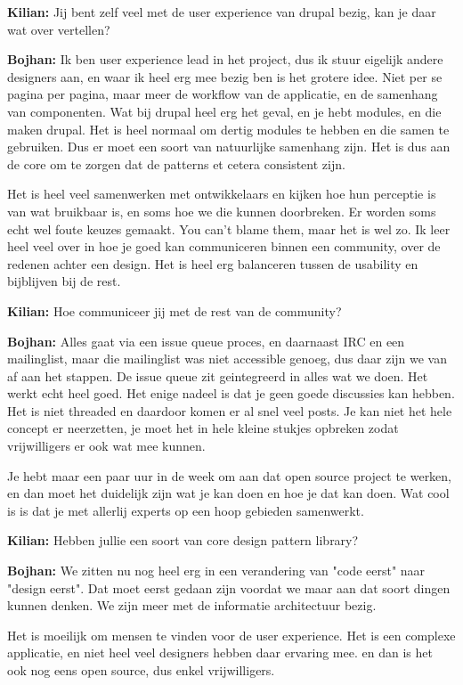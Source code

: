 \textbf{Kilian:} Jij bent zelf veel met de user experience van drupal bezig, kan je daar wat over vertellen?

\textbf{Bojhan:} Ik ben user experience lead in het project, dus ik stuur eigelijk andere designers aan, en waar ik heel erg mee bezig ben is het grotere idee. Niet per se pagina per pagina, maar meer de workflow van de applicatie, en de samenhang van componenten. Wat bij drupal heel erg het geval, en je hebt modules, en die maken drupal. Het is heel normaal om dertig modules te hebben en die samen te gebruiken. Dus er moet een soort van natuurlijke samenhang zijn. Het is dus aan de core om te zorgen dat de patterns et cetera consistent zijn.

Het is heel veel samenwerken met ontwikkelaars en kijken hoe hun perceptie is van wat bruikbaar is, en soms hoe we die kunnen doorbreken. Er worden soms echt wel foute keuzes gemaakt. You can't blame them, maar het is wel zo. Ik leer heel veel over in hoe je goed kan communiceren binnen een community, over de redenen achter een design. Het is heel erg balanceren tussen de usability en bijblijven bij de rest.

\textbf{Kilian:} Hoe communiceer jij met de rest van de community?

\textbf{Bojhan:} Alles gaat via een issue queue proces, en daarnaast IRC en een mailinglist, maar die mailinglist was niet accessible genoeg, dus daar zijn we van af aan het stappen. De issue queue zit geintegreerd in alles wat we doen. Het werkt echt heel goed. Het enige nadeel is dat je geen goede discussies kan hebben. Het is niet threaded en daardoor komen er al snel veel posts. Je kan niet het hele concept er neerzetten, je moet het in hele kleine stukjes opbreken zodat vrijwilligers er ook wat mee kunnen.

Je hebt maar een paar uur in de week om aan dat open source project te werken, en dan moet het duidelijk zijn wat je kan doen en hoe je dat kan doen. Wat cool is is dat je met allerlij experts op een hoop gebieden samenwerkt.

\textbf{Kilian:} Hebben jullie een soort van core design pattern library?

\textbf{Bojhan:} We zitten nu nog heel erg in een verandering van "code eerst" naar "design eerst". Dat moet eerst gedaan zijn voordat we maar aan dat soort dingen kunnen denken. We zijn meer met de informatie architectuur bezig.

Het is moeilijk om mensen te vinden voor de user experience. Het is een complexe applicatie, en niet heel veel designers hebben daar ervaring mee. en dan is het ook nog eens open source, dus enkel vrijwilligers.

